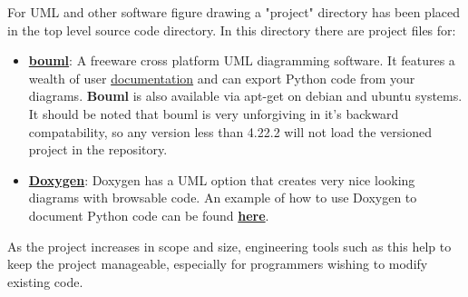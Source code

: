 \documentclass[12pt]{article}
\begin{document}
For UML and other software figure drawing a "project" directory has been placed in the top level source code directory. In this directory there are project files for:

\begin{itemize}
\item[] \href{http://bouml.free.fr}{\bf bouml}: A freeware cross platform UML diagramming software. It features a wealth of user \href{http://bouml.free.fr/doc/index.html}{documentation} and can export Python code from your diagrams. {\bf Bouml} is also available via apt-get on debian and ubuntu systems. It should be noted that bouml is very unforgiving in it's backward compatability, so any version less than 4.22.2 will not load the versioned project in the repository.
\item[] \href{http://www.stack.nl/~dimitri/doxygen/}{\bf Doxygen}: Doxygen has a UML option that creates very nice looking diagrams with browsable code. An example of how to use Doxygen to document Python code can be found \href{https://www.cells.es/Members/srubio/howto/doxygen/}{\bf here}.
\end{itemize}

As the project increases in scope and size, engineering tools such as this help to keep the project manageable, especially for programmers wishing to modify existing code.
\end{document}
